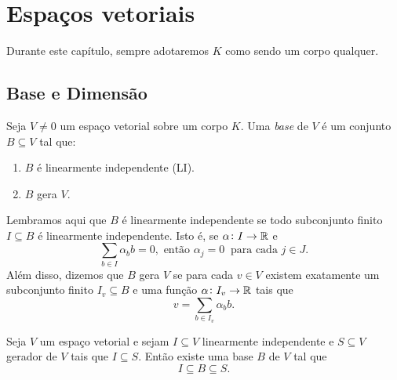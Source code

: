 \documentclass[11pt,twoside,a4paper]{book}
\begin{document}
\chapter{Espaços vetoriais}

Durante este capítulo, sempre adotaremos $K$ como sendo um corpo qualquer.

\section{Base e Dimensão}

\begin{definicao}\label{lidef}
Seja $V \neq 0$ um espaço vetorial sobre um corpo $K$. Uma \emph{base} de \(V\) é um conjunto $B\subseteq V$ tal que:
\begin{enumerate}[label=(\roman*)]
\item $B$ é linearmente independente (LI).
\item $B$ gera $V$.
\end{enumerate}
\end{definicao}
Lembramos aqui que $B$ é linearmente independente se todo subconjunto finito
$I\subseteq B$ é linearmente independente. Isto é, se \(\alpha\colon I\to\mathbb{R}\) e
\[
\sum_{b\in I} \alpha_bb = 0,
 \text{ então } \alpha_j = 0 \ \text{ para cada 
} j \in J.\] 
Além disso, dizemos que \(B\) gera \(V\) se para cada \(v\in V\) existem exatamente
um subconjunto finito \(I_v\subseteq B\) e uma função \(\alpha\colon
I_v\to\mathbb{R}\) tais que \[v=\sum_{b\in I_v}\alpha_bb.\]  
\begin{teorema}\label{existbase}
Seja $V$ um espaço vetorial e sejam $I\subseteq V$ linearmente independente e $S\subseteq V$ gerador de $V$ tais que $I\subseteq S$. Então existe uma base $B$ de $V$ tal que \[I\subseteq B\subseteq S.\]
\end{teorema}
\end{document}
